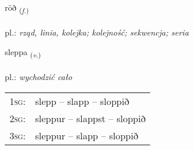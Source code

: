 \documentclass[frontgrid, backgrid]{flacards}\usepackage[]{graphicx}\usepackage[]{xcolor}
\begin{document}
\renewcommand{\flhead}{\vskip5pt \fboxsep=0pt {\small\bfseries\footnotesize Nafnorð | Noun}}
\renewcommand{\fcfoot}{\vskip5pt \fboxsep=0pt \hspace{2pt}{\small\bfseries\footnotesize 1K}}

\renewcommand{\blhead}{\vskip5pt {\small\bfseries\footnotesize Nafnorð | Noun }}
\renewcommand{\bcfoot}{\vskip5pt \hspace{2pt}{\small\bfseries\footnotesize 1K}}


{röð \small{\textsubscript{(\textit{f.})}} \\[1ex] %
\textphonetic{[rœːð]} \\
pl.: \emph{rząd, linia, kolejka; kolejność; sekwencja; seria} \\  [2ex]
\renewcommand*{\arraystretch}{0.8}
}

\renewcommand{\flhead}{\vskip5pt \fboxsep=0pt {\small\bfseries\footnotesize Sagnorð | Verb}}
\renewcommand{\fcfoot}{\vskip5pt \fboxsep=0pt \hspace{2pt}{\small\bfseries\footnotesize 1K}}

\renewcommand{\blhead}{\vskip5pt {\small\bfseries\footnotesize Sagnorð | Verb }}
\renewcommand{\bcfoot}{\vskip5pt \hspace{2pt}{\small\bfseries\footnotesize 1K}}


{sleppa \small{\textsubscript{(\textit{v.})}} \\[1ex] %
\textphonetic{[stlɛhpa]} \\
pl.: \emph{wychodzić cało} \\  [2ex]
\renewcommand*{\arraystretch}{0.8}
\begin{tabular}{p{1cm}l}
\textsc{1sg}: & slepp -- slapp -- sloppið \\ 
\textsc{2sg}: & sleppur -- slappst -- sloppið \\ 
\textsc{3sg}: & sleppur -- slapp -- sloppið \\ 
\end{tabular}
}
\end{document}
